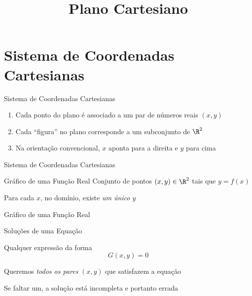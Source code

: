 \documentclass[fleqn,utf8,aspectratio=169,12pt,ignorenonframetext]{beamer}
\title{Plano Cartesiano}
\begin{document}
\addtitle

\section{Sistema de Coordenadas Cartesianas}

\begin{frame}{Sistema de Coordenadas Cartesianas}
  \begin{enumerate}[<+->]
    \item Cada ponto do plano é associado a um par de números reais $(x, y)$
    \item Cada ``figura'' no plano corresponde a um subconjunto de $\R^2$
    \item Na orientação convencional, $x$ aponta para a direita e $y$ para cima
  \end{enumerate}
\end{frame}

\begin{frame}{Sistema de Coordenadas Cartesianas}
  \centering
  
\end{frame}

\begin{frame}{Gráfico de uma Função Real}
  Conjunto de pontos $(x, y) \in \R^2$ tais que \(y = f(x)\)

  \pause
  \vspace{\baselineskip}
  Para cada $x$, no domínio, existe \emph{um único} $y$
\end{frame}

\begin{frame}{Gráfico de uma Função Real}
  \centering
  
\end{frame}

\begin{frame}{Soluções de uma Equação}

  Qualquer expressão da forma
  \[
    G(x, y) = 0
  \]

  \pause
  \vspace{\baselineskip}
  Queremos \emph{todos os pares} $(x, y)$ que satisfazem a equação

  \pause
  \vspace{\baselineskip}
  Se faltar um, a solução está incompleta e portanto errada
\end{frame}
\end{document}
